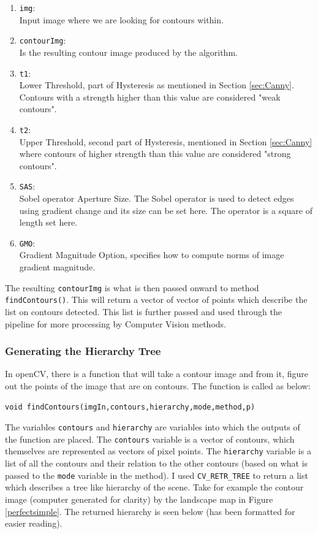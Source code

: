 \documentclass[11pt]{article}
\begin{document}
\begin{enumerate}
	\item \texttt{img}: \\
		Input image where we are looking for contours within.
	\item \texttt{contourImg}: \\
		Is the resulting contour image produced by the algorithm.
	\item \texttt{t1}: \\
		Lower Threshold, part of Hysteresis as mentioned in 
		Section \ref{sec:Canny}. Contours with a strength higher than
		this value are considered "weak contours".	
	\item \texttt{t2}: \\
		Upper Threshold, second part of Hysteresis, mentioned in 
		Section \ref{sec:Canny} where contours of higher strength than
		this value are considered "strong contours".
	\item \texttt{SAS}: \\
		Sobel operator Aperture Size. The Sobel operator is used to 
		detect edges using gradient change and its size can be set here.
		The operator is a square of length set here.
	\item \texttt{GMO}: \\
		Gradient Magnitude Option, specifies how to compute norms of
		image gradient magnitude.
\end{enumerate}

The resulting \texttt{contourImg} is what is then passed onward to 
method \texttt{findContours()}. This will return a vector of vector
of points which describe the list on contours detected. This list
is further passed and used through the pipeline for more 
processing by Computer Vision methods. 

\subsubsection{Generating the Hierarchy Tree}
\label{sec:hierarchytree}
In openCV, there is a function that will take a contour image and from
it, figure out the points of the image that are on contours. The function is
called as below:
\begin{lstlisting}
void findContours(imgIn,contours,hierarchy,mode,method,p)
\end{lstlisting}

The variables \texttt{contours} and \texttt{hierarchy} are variables into which
the outputs of the function are placed. The \texttt{contours} variable is a vector
of contours, which themselves are represented as vectors of pixel points. 
The \texttt{hierarchy} variable is a list of all the contours and their
relation to the other contours (based on what is passed to the \texttt{mode}
variable in the method). I used \texttt{CV\_RETR\_TREE} to return a list which
describes a tree like hierarchy of the scene. Take for example the contour
image (computer generated for clarity) by the landscape map in 
Figure \ref{perfectsimple}.
The returned hierarchy is seen below (has been formatted for easier reading).
\end{document}

